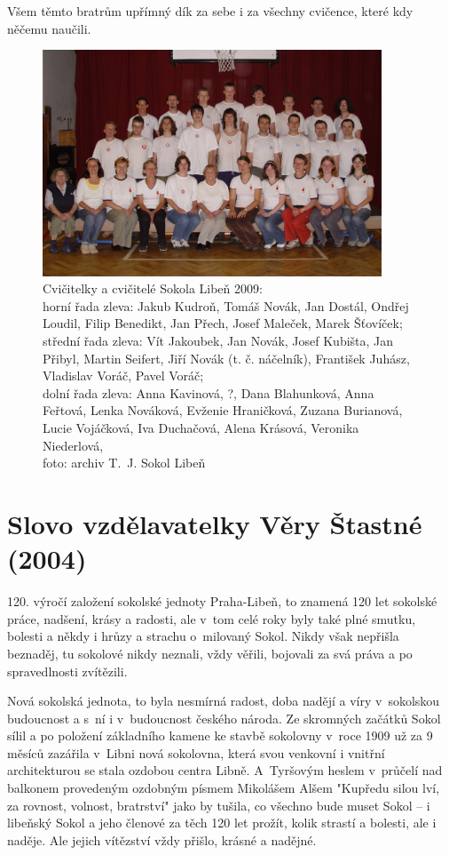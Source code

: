 \documentclass[a5paper, 11pt, twoside]{article}
\begin{document}
Všem těmto bratrům upřímný dík za sebe i za všechny cvičence, které kdy
něčemu naučili.

\begin{figure}[h!]
  \centering 
  \includegraphics[width=0.9\textwidth]{img/48_cvicitele.JPG}
  \caption*{Cvičitelky a cvičitelé Sokola Libeň 2009: \\
  horní řada zleva: Jakub Kudroň, Tomáš Novák, Jan Dostál, Ondřej Loudil, Filip Benedikt, Jan
  Přech, Josef Maleček, Marek Šťovíček; \\
  střední řada zleva: Vít Jakoubek,
  Jan Novák, Josef Kubišta, Jan Přibyl, Martin Seifert, Jiří Novák (t. č.
  náčelník), František Juhász, Vladislav Voráč, Pavel Voráč; \\
  dolní řada
  zleva: Anna Kavinová, ?, Dana Blahunková, Anna Feřtová, Lenka Nováková,
  Evženie Hraničková, Zuzana Burianová, Lucie Vojáčková, Iva Duchačová,
  Alena Krásová, Veronika Niederlová, \\
  foto: archiv T.~J. Sokol Libeň}
\end{figure}

\section{Slovo vzdělavatelky Věry Štastné
(2004)}

120. výročí založení sokolské jednoty Praha-Libeň, to znamená 120 let
sokolské práce, nadšení, krásy a radosti, ale v~tom celé roky byly také
plné smutku, bolesti a někdy i hrůzy a strachu o~milovaný Sokol. Nikdy
však nepřišla beznaděj, tu sokolové nikdy neznali, vždy věřili, bojovali
za svá práva a po spravedlnosti zvítězili.

Nová sokolská jednota, to byla nesmírná radost, doba nadějí a víry
v~sokolskou budoucnost a s~ní i v~budoucnost českého národa. Ze skromných
začátků Sokol sílil a po položení základního kamene ke stavbě sokolovny
v~roce 1909 už za 9 měsíců zazářila v~Libni nová sokolovna, která svou
venkovní i vnitřní architekturou se stala ozdobou centra Libně.
A~Tyršovým heslem v~průčelí nad balkonem provedeným ozdobným písmem
Mikolášem Alšem "Kupředu silou lví, za rovnost, volnost, bratrství"
jako by tušila, co všechno bude muset Sokol --⁠⁠⁠⁠⁠⁠ i libeňský Sokol a jeho
členové za těch 120 let prožít, kolik strastí a bolesti, ale i naděje.
Ale jejich vítězství vždy přišlo, krásné a nadějné.
\end{document}
